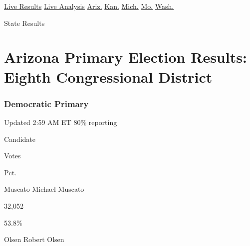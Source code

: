 \href{https://www.nytimes.com/interactive/2020/08/04/us/elections/results-arizona-kansas-michigan-missouri-primaries.html?action=click\&module=ELEX_results\&pgtype=Interactive\&region=Navigation}{Live
Results}
\href{https://www.nytimes.com/interactive/2020/08/04/us/elections/live-analysis-arizona-kansas-michigan-missouri-primaries.html?action=click\&module=ELEX_results\&pgtype=Interactive\&region=Navigation}{Live
Analysis}
\href{https://www.nytimes.com/interactive/2020/08/04/us/elections/results-arizona-primary-elections.html?action=click\&module=ELEX_results\&pgtype=Interactive\&region=Navigation}{Ariz.}
\href{https://www.nytimes.com/interactive/2020/08/04/us/elections/results-kansas-primary-elections.html?action=click\&module=ELEX_results\&pgtype=Interactive\&region=Navigation}{Kan.}
\href{https://www.nytimes.com/interactive/2020/08/04/us/elections/results-michigan-primary-elections.html?action=click\&module=ELEX_results\&pgtype=Interactive\&region=Navigation}{Mich.}
\href{https://www.nytimes.com/interactive/2020/08/04/us/elections/results-missouri-primary-elections.html?action=click\&module=ELEX_results\&pgtype=Interactive\&region=Navigation}{Mo.}
\href{https://www.nytimes.com/interactive/2020/08/04/us/elections/results-washington-primary-elections.html?action=click\&module=ELEX_results\&pgtype=Interactive\&region=Navigation}{Wash.}

 State Results

\hypertarget{arizona-primary-election-results-eighth-congressional-district-1}{%
\section{Arizona Primary Election Results: Eighth Congressional
District}\label{arizona-primary-election-results-eighth-congressional-district-1}}

\hypertarget{democratic-primary}{%
\subsubsection{Democratic Primary}\label{democratic-primary}}

Updated 2:59 AM ET 80\% reporting

Candidate

Votes

Pct.

 Muscato Michael Muscato

32,052

53.8\%

 Olsen Robert Olsen

